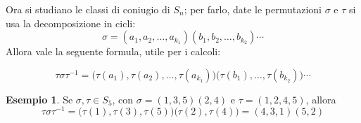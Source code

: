\documentclass[11pt, a4paper]{scrartcl}
\theoremstyle{definition}
\newtheorem{esempio}{Esempio}
\numberwithin{esempio}{section}
\theoremstyle{definition}
\numberwithin{obs}{section}
\numberwithin{nota}{section}
\newenvironment{boxenv}[1][]{
    \begin{eqbox}[#1]
    }{
   \end{eqbox}
}
\numberwithin{equation}{subsection}
\begin{document}
	Ora si studiano le classi di coniugio di $S_n$; per farlo, date le permutazioni $\sigma $ e $\tau $ si usa la decomposizione in cicli:
	\[
	\sigma = (a_1, a_2, \ldots, a_{k_1} )( b_1, b_2,\ldots, b_{k_2} ) \cdots
	\] 
	Allora vale la seguente formula, utile per i calcoli:
	\begin{boxenv}[]
		\begin{equation}\label{conpermform}
		\tau \sigma \tau ^{-1} = \big(\tau (a_1), \tau (a_2),\ldots, \tau (a_{k_1} )\big)\big(\tau (b_1),\ldots,\tau(b _{k_2} )\big) \cdots
	\end{equation}
	\end{boxenv}
	\begin{esempio}
	Se $\sigma ,\tau  \in S_5$, con $\sigma  = (1,3,5)(2,4)$ e $\tau  = (1,2,4,5)$, allora
	\[
	\tau \sigma \tau ^{-1} = \big(\tau (1), \tau (3), \tau (5)\big)\big(\tau (2),\tau (4)\big)= (4,3,1)(5,2)
	\] 
	
	\end{esempio}
\end{document}
